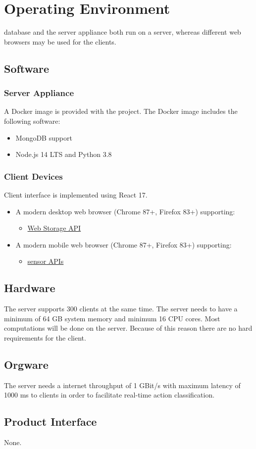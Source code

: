 \section{Operating Environment}

\Gls{database} and the server appliance both run on a server, whereas different web browsers may be used for the clients.

\subsection{Software}
\subsubsection{Server Appliance}
A \Gls{Docker} image is provided with the project. The \Gls{Docker} image includes the following software:
\begin{itemize}
    \item \gls{MongoDB} support
    \item \gls{Node.js} 14 LTS and Python 3.8
\end{itemize}
\subsubsection{Client Devices}
Client interface is implemented using \gls{React} 17.
\begin{itemize}
    \item A modern desktop web browser (Chrome 87+, Firefox 83+) supporting:
    \begin{itemize}
        \item \href{https://developer.mozilla.org/en-US/docs/Web/API/Web_Storage_API}{Web Storage API}
    \end{itemize}
    \item A modern mobile web browser (Chrome 87+, Firefox 83+) supporting:
    \begin{itemize}
        \item \href{https://developer.mozilla.org/en-US/docs/Web/API/Sensor_APIs}{\Gls{sensor} APIs}
    \end{itemize}
\end{itemize}

\subsection{Hardware}

The server supports 300 clients at the same time. The server needs to have a minimum of 64 GB system memory and minimum 16 CPU cores. Most computations will be done on the server. Because of this reason there are no hard requirements for the client.

\subsection{Orgware}
The server needs a internet throughput of 1 GBit/s with maximum latency of 1000 ms to clients in order to facilitate real-time action \gls{classification}.

\subsection{Product Interface}
None.